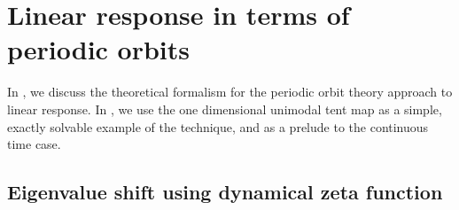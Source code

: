 \documentclass[aps,pre,
                showpacs,
                twocolumn,
                groupedaddress,
                floatfix]{revtex4-1}
\begin{document}
\section{Linear response in terms of periodic orbits}
\label{sect:LinRespPO}

In , we discuss the theoretical formalism for the
periodic orbit theory approach to linear response. In
, we use the one dimensional unimodal tent map as
a simple, exactly solvable example of the technique, and as a prelude to
the continuous time case.

\subsection{Eigenvalue shift using dynamical zeta function}
\label{sect:EigeShiftZeta}
\end{document}
